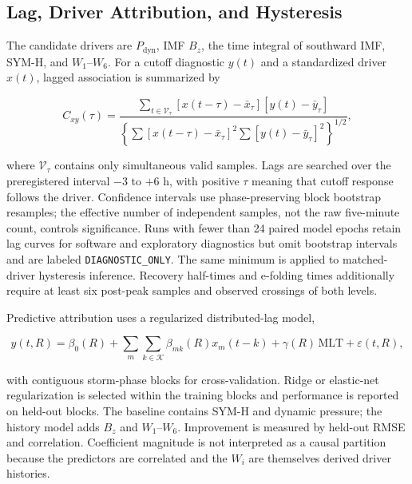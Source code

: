 \subsection{Lag, Driver Attribution, and Hysteresis}

The candidate drivers are $P_{\mathrm{dyn}}$, IMF $B_z$, the time integral of
southward IMF, SYM-H, and $W_1$--$W_6$. For a cutoff diagnostic $y(t)$ and a
standardized driver $x(t)$, lagged association is summarized by
\begin{linenomath*}
\begin{equation}
 C_{xy}(\tau)=
 \frac{\sum_{t\in\mathcal{V}_{\tau}}[x(t-\tau)-\bar{x}_{\tau}]
 [y(t)-\bar{y}_{\tau}]}
 {\left\{\sum[x(t-\tau)-\bar{x}_{\tau}]^2
 \sum[y(t)-\bar{y}_{\tau}]^2\right\}^{1/2}},
 \label{eq:exp-lag-correlation}
\end{equation}
\end{linenomath*}
where $\mathcal{V}_{\tau}$ contains only simultaneous valid samples. Lags are
searched over the preregistered interval $-3$ to $+6$ h, with positive $\tau$
meaning that cutoff response follows the driver. Confidence intervals use
phase-preserving block bootstrap resamples; the effective number of
independent samples, not the raw five-minute count, controls significance.
Runs with fewer than 24 paired model epochs retain lag curves for software and
exploratory diagnostics but omit bootstrap intervals and are labeled
\texttt{DIAGNOSTIC\_ONLY}. The same minimum is applied to matched-driver
hysteresis inference. Recovery half-times and e-folding times additionally
require at least six post-peak samples and observed crossings of both levels.

Predictive attribution uses a regularized distributed-lag model,
\begin{linenomath*}
\begin{equation}
 y(t,R)=\beta_0(R)+\sum_m\sum_{k\in\mathcal{K}}
 \beta_{mk}(R)x_m(t-k)+\gamma(R)\,\mathrm{MLT}+\varepsilon(t,R),
 \label{eq:exp-distributed-lag}
\end{equation}
\end{linenomath*}
with contiguous storm-phase blocks for cross-validation. Ridge or elastic-net
regularization is selected within the training blocks and performance is
reported on held-out blocks. The baseline contains SYM-H and dynamic pressure;
the history model adds $B_z$ and $W_1$--$W_6$. Improvement is measured by
held-out RMSE and correlation. Coefficient magnitude is not interpreted as a
causal partition because the predictors are correlated and the $W_i$ are
themselves derived driver histories.

